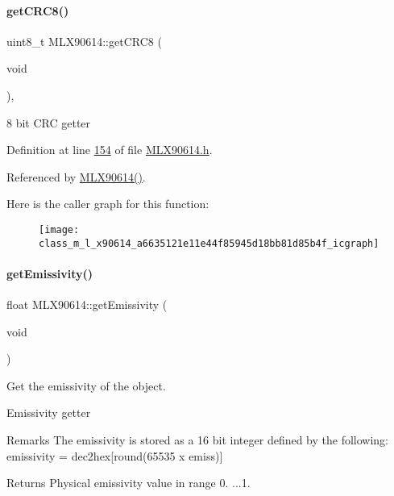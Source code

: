 \paragraph{\texorpdfstring{get\+C\+R\+C8()}{getCRC8()}}
{\footnotesize\ttfamily uint8\+\_\+t M\+L\+X90614\+::get\+C\+R\+C8 (\begin{DoxyParamCaption}\item[{void}]{ }\end{DoxyParamCaption})\hspace{0.3cm}{\ttfamily [inline]}, {\ttfamily [private]}}

8 bit C\+RC getter 

Definition at line \mbox{\hyperlink{_m_l_x90614_8h_source_l00154}{154}} of file \mbox{\hyperlink{_m_l_x90614_8h_source}{M\+L\+X90614.\+h}}.



Referenced by \mbox{\hyperlink{_m_l_x90614_8cpp_source_l00046}{M\+L\+X90614()}}.

Here is the caller graph for this function\+:\nopagebreak
\begin{figure}[H]
\begin{center}
\leavevmode
\texttt{[image: class\_m\_l\_x90614\_a6635121e11e44f85945d18bb81d85b4f\_icgraph]}
\end{center}
\end{figure}
\mbox{\label{class_m_l_x90614_a44234371f1e9dd36781898d0c87fdbbf}} 
\paragraph{\texorpdfstring{get\+Emissivity()}{getEmissivity()}}
{\footnotesize\ttfamily float M\+L\+X90614\+::get\+Emissivity (\begin{DoxyParamCaption}\item[{void}]{ }\end{DoxyParamCaption})}



Get the emissivity of the object. 

Emissivity getter

\begin{DoxyRemark}{Remarks}
The emissivity is stored as a 16 bit integer defined by the following\+: ~\newline
{\ttfamily  emissivity = dec2hex\mbox{[}round(65535 x emiss)\mbox{]}} 
\end{DoxyRemark}
\begin{DoxyReturn}{Returns}
Physical emissivity value in range 0. ...1. 
\end{DoxyReturn}


